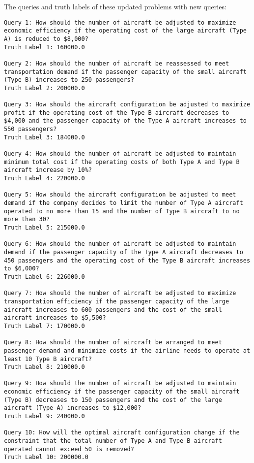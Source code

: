 The queries and truth labels of these updated problems with new queries:
\begin{lstlisting}[basicstyle=\normalfont]
Query 1: How should the number of aircraft be adjusted to maximize economic efficiency if the operating cost of the large aircraft (Type A) is reduced to $8,000?
Truth Label 1: 160000.0

Query 2: How should the number of aircraft be reassessed to meet transportation demand if the passenger capacity of the small aircraft (Type B) increases to 250 passengers?
Truth Label 2: 200000.0

Query 3: How should the aircraft configuration be adjusted to maximize profit if the operating cost of the Type B aircraft decreases to $4,000 and the passenger capacity of the Type A aircraft increases to 550 passengers?
Truth Label 3: 184000.0

Query 4: How should the number of aircraft be adjusted to maintain minimum total cost if the operating costs of both Type A and Type B aircraft increase by 10%?
Truth Label 4: 220000.0

Query 5: How should the aircraft configuration be adjusted to meet demand if the company decides to limit the number of Type A aircraft operated to no more than 15 and the number of Type B aircraft to no more than 30?
Truth Label 5: 215000.0

Query 6: How should the number of aircraft be adjusted to maintain demand if the passenger capacity of the Type A aircraft decreases to 450 passengers and the operating cost of the Type B aircraft increases to $6,000?
Truth Label 6: 226000.0

Query 7: How should the number of aircraft be adjusted to maximize transportation efficiency if the passenger capacity of the large aircraft increases to 600 passengers and the cost of the small aircraft increases to $5,500?
Truth Label 7: 170000.0

Query 8: How should the number of aircraft be arranged to meet passenger demand and minimize costs if the airline needs to operate at least 10 Type B aircraft?
Truth Label 8: 210000.0

Query 9: How should the number of aircraft be adjusted to maintain economic efficiency if the passenger capacity of the small aircraft (Type B) decreases to 150 passengers and the cost of the large aircraft (Type A) increases to $12,000?
Truth Label 9: 240000.0

Query 10: How will the optimal aircraft configuration change if the constraint that the total number of Type A and Type B aircraft operated cannot exceed 50 is removed?
Truth Label 10: 200000.0
\end{lstlisting}


